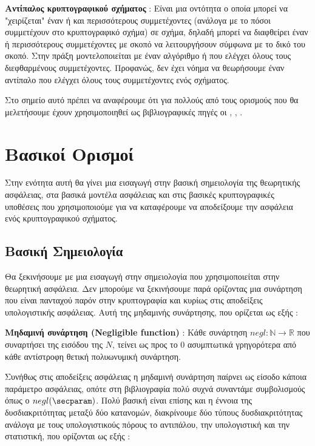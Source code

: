 \begin{definition}
\textbf{Αντίπαλος κρυπτογραφικού σχήματος} : Είναι μια οντότητα ο οποία μπορεί να "χειρίζεται" έναν ή και περισσότερους συμμετέχοντες (ανάλογα με το πόσοι συμμετέχουν στο κρυπτογραφικό σχήμα) σε σχήμα, δηλαδή μπορεί να διαφθείρει έναν ή περισσότερους συμμετέχοντες με σκοπό να λειτουργήσουν σύμφωνα με το δικό του σκοπό. Στην πράξη μοντελοποιείται με έναν αλγόριθμο ή που ελέγχει όλους τους διεφθαρμένους συμμετέχοντες. Προφανώς, δεν έχει νόημα να θεωρήσουμε έναν αντίπαλο που ελέγχει όλους τους συμμετέχοντες ενός σχήματος.
\end{definition}

Στο σημείο αυτό πρέπει να αναφέρουμε ότι για πολλούς από τους ορισμούς που θα μελετήσουμε έχουν χρησιμοποιηθεί ως βιβλιογραφικές πηγές οι \cite{Bauer2011}, \cite{hoffstein2008introduction}, \cite{10.1561/3300000019}.

\section{Βασικοί Ορισμοί}

Στην ενότητα αυτή θα γίνει μια εισαγωγή στην βασική σημειολογία της θεωρητικής ασφάλειας, στα βασικά μοντέλα ασφάλειας και στις βασικές κρυπτογραφικές υποθέσεις που χρησιμοποιούμε για να καταφέρουμε να αποδείξουμε την ασφάλεια ενός κρυπτογραφικού σχήματος.
\subsection{Βασική Σημειολογία}

Θα ξεκινήσουμε με μια εισαγωγή στην σημειολογία που χρησιμοποιείται στην θεωρητική ασφάλεια. Δεν μπορούμε να ξεκινήσουμε παρά ορίζοντας μια συνάρτηση που είναι πανταχού παρόν στην κρυπτογραφία και κυρίως στις αποδείξεις υπολογιστικής ασφάλειας. Αυτή της μηδαμινής συνάρτησης, που ορίζεται ως εξής :

\begin{definition}
\textbf{Μηδαμινή συνάρτηση (Negligible function)} : Κάθε συνάρτηση $negl: \mathbb{N} \rightarrow \mathbb{R}$ που συναρτήσει της εισόδου της $Ν$, τείνει ως προς το $0$ ασυμπτωτικά γρηγορότερα από κάθε αντίστροφη θετική πολυωνυμική συνάρτηση.
\end{definition}

Συνήθως στις αποδείξεις ασφάλειας η μηδαμινή συνάρτηση παίρνει ως είσοδο κάποια παράμετρο ασφάλειας, οπότε στη βιβλιογραφία πολύ συχνά συναντάμε συμβολισμούς όπως ο $negl(\secparam)$. Πολύ βασική είναι επίσης και η έννοια της δυσδιακριτότητας μεταξύ δύο κατανομών, διακρίνουμε δύο τύπους δυσδιακριτότητας ανάλογα με τους υπολογιστικούς πόρους το αντιπάλου, την υπολογιστική και την στατιστική, που ορίζονται ως εξής :

